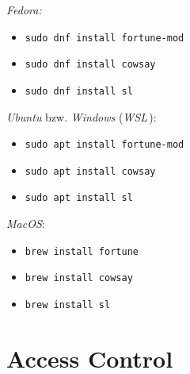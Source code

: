 \documentclass[english]{sheet}
\begin{document}
\begin{solution}
    \emph{Fedora:}
    \begin{itemize}
        \item \texttt{sudo dnf install fortune-mod}
        \item \texttt{sudo dnf install cowsay}
        \item \texttt{sudo dnf install sl}
    \end{itemize}
    \emph{Ubuntu} bzw. \emph{Windows} (\emph{WSL}\,):
    \begin{itemize}
        \item \texttt{sudo apt install fortune-mod}
        \item \texttt{sudo apt install cowsay}
        \item \texttt{sudo apt install sl}
    \end{itemize}
    \emph{MacOS}:
    \begin{itemize}
        \item \texttt{brew install fortune}
        \item \texttt{brew install cowsay}
        \item \texttt{brew install sl}
    \end{itemize}
\end{solution}

\section{Access Control}
\end{document}
